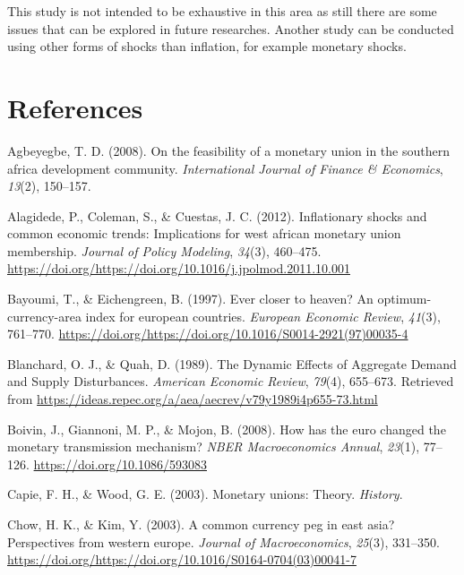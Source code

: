 \documentclass[]{article}
\begin{document}
This study is not intended to be exhaustive in this area as still there are some issues that can be explored in future researches. Another study can be conducted using other forms of shocks than inflation, for example monetary shocks.

\hypertarget{references}{%
\section*{References}\label{references}}

\noindent
{}
\parindent-1cm

\hypertarget{refs}{}
\leavevmode\hypertarget{ref-agbeyegbe2008feasibility}{}%
Agbeyegbe, T. D. (2008). On the feasibility of a monetary union in the southern africa development community. \emph{International Journal of Finance \& Economics}, \emph{13}(2), 150--157.

\leavevmode\hypertarget{ref-ALAGIDEDE2012460}{}%
Alagidede, P., Coleman, S., \& Cuestas, J. C. (2012). Inflationary shocks and common economic trends: Implications for west african monetary union membership. \emph{Journal of Policy Modeling}, \emph{34}(3), 460--475. \url{https://doi.org/https://doi.org/10.1016/j.jpolmod.2011.10.001}

\leavevmode\hypertarget{ref-BAYOUMI1997761}{}%
Bayoumi, T., \& Eichengreen, B. (1997). Ever closer to heaven? An optimum-currency-area index for european countries. \emph{European Economic Review}, \emph{41}(3), 761--770. \url{https://doi.org/https://doi.org/10.1016/S0014-2921(97)00035-4}

\leavevmode\hypertarget{ref-Blanchard1989}{}%
Blanchard, O. J., \& Quah, D. (1989). The Dynamic Effects of Aggregate Demand and Supply Disturbances. \emph{American Economic Review}, \emph{79}(4), 655--673. Retrieved from \url{https://ideas.repec.org/a/aea/aecrev/v79y1989i4p655-73.html}

\leavevmode\hypertarget{ref-Boivin2008}{}%
Boivin, J., Giannoni, M. P., \& Mojon, B. (2008). How has the euro changed the monetary transmission mechanism? \emph{NBER Macroeconomics Annual}, \emph{23}(1), 77--126. \url{https://doi.org/10.1086/593083}

\leavevmode\hypertarget{ref-capie2003monetary}{}%
Capie, F. H., \& Wood, G. E. (2003). Monetary unions: Theory. \emph{History}.

\leavevmode\hypertarget{ref-Chow2003}{}%
Chow, H. K., \& Kim, Y. (2003). A common currency peg in east asia? Perspectives from western europe. \emph{Journal of Macroeconomics}, \emph{25}(3), 331--350. \url{https://doi.org/https://doi.org/10.1016/S0164-0704(03)00041-7}
\end{document}
